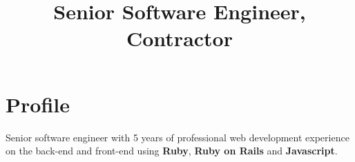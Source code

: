 \documentclass[11pt,a4paper,sans]{moderncv}        %
\title{Senior Software Engineer, Contractor}
\begin{document}
\setlength{\makecvtitlenamewidth}{400pt}
\makecvtitle



\vspace{-10pt}
\section{Profile}
Senior software engineer with 5 years of professional web development experience on the back-end and front-end using \textbf{Ruby}, \textbf{Ruby on Rails} and \textbf{Javascript}.
\end{document}
